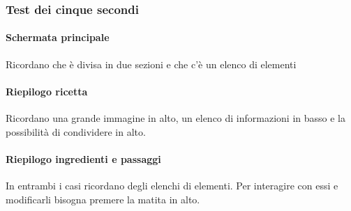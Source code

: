 \subsubsection{Test dei cinque secondi}
\paragraph{Schermata principale}
Ricordano che è divisa in due sezioni e che c'è un elenco di elementi

\paragraph{Riepilogo ricetta}
Ricordano una grande immagine in alto, un elenco di informazioni in basso e la possibilità di condividere in alto.

\paragraph{Riepilogo ingredienti e passaggi}
In entrambi i casi ricordano degli elenchi di elementi.
Per interagire con essi e modificarli bisogna premere la matita in alto.
